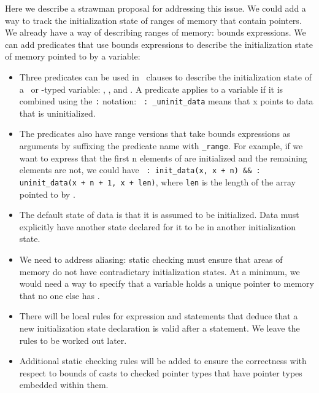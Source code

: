 Here we describe a strawman proposal for addressing this issue.  
We could add a way to track the initialization state of ranges of memory 
that contain pointers. We already have a way of 
describing ranges of memory: bounds expressions.  We can add
predicates that use bounds expressions to describe the initialization
state of memory pointed to by a variable:
\begin{itemize}
\item Three predicates can be used in \ clauses
to describe the initialization state of a \arrayptr\ or \ptr-typed variable:
, , and .
A predicate applies to a variable if it is combined using the \texttt{:}
notation: \texttt{ : \_uninit\_data} means that x points to data
that is uninitialized.
\item The predicates also have range versions that take bounds expressions
as arguments by suffixing the predicate name with \texttt{\_range}.  For example, 
if we want to express that the first n elements of  are initialized
and the remaining elements are not, we could have
\texttt{ : init\_data(x, x + n)
\&\&  : uninit\_data(x + n + 1, x + len)}, where \texttt{len} is 
the length of the array pointed to by .
\item The default state of data is that it is assumed to be initialized.
Data must explicitly have another state declared for it to be in another
initialization state.
\item We need to address aliasing: static checking must ensure
that areas of memory do not have contradictary initialization states.
At a minimum, we would need a way to specify that a variable holds
a unique pointer to memory that no one else has \cite{Jim2002}.
\item There will be local rules for expression and statements that deduce that a new
initialization state declaration is valid after a statement.  We leave 
the rules to be worked out later.
\item Additional static checking rules will be added to ensure the
correctness with respect to bounds of casts to checked pointer types that have pointer types embedded
within them.
\end{itemize}

